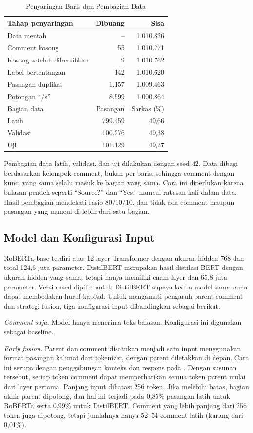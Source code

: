 \documentclass[conference]{IEEEtran}
\begin{document}
\begin{table}[t]
\caption{Penyaringan Baris dan Pembagian Data}
\label{tab:data}
\centering
\begin{tabular}{lrr}
\hline
Tahap penyaringan & Dibuang & Sisa \\
\hline
Data mentah & -- & 1.010.826 \\
Comment kosong & 55 & 1.010.771 \\
Kosong setelah dibersihkan & 9 & 1.010.762 \\
Label bertentangan & 142 & 1.010.620 \\
Pasangan duplikat & 1.157 & 1.009.463 \\
Potongan ``/s'' & 8.599 & 1.000.864 \\
\hline
Bagian data & Pasangan & Sarkas (\%) \\
\hline
Latih & 799.459 & 49,66 \\
Validasi & 100.276 & 49,38 \\
Uji & 101.129 & 49,27 \\
\hline
\end{tabular}
\end{table}

Pembagian data latih, validasi, dan uji dilakukan dengan seed 42. Data dibagi berdasarkan kelompok comment, bukan per baris, sehingga comment dengan kunci yang sama selalu masuk ke bagian yang sama. Cara ini diperlukan karena balasan pendek seperti ``Source?'' dan ``Yes.'' muncul ratusan kali dalam data. Hasil pembagian mendekati rasio 80/10/10, dan tidak ada comment maupun pasangan yang muncul di lebih dari satu bagian.

\subsection{Model dan Konfigurasi Input}
RoBERTa-base \cite{liu2019roberta} terdiri atas 12 layer Transformer dengan ukuran hidden 768 dan total 124,6 juta parameter. DistilBERT \cite{sanh2019distilbert} merupakan hasil distilasi BERT dengan ukuran hidden yang sama, tetapi hanya memiliki enam layer dan 65,8 juta parameter. Versi cased dipilih untuk DistilBERT supaya kedua model sama-sama dapat membedakan huruf kapital. Untuk mengamati pengaruh parent comment dan strategi fusion, tiga konfigurasi input dibandingkan sebagai berikut.

\textit{Comment saja.} Model hanya menerima teks balasan. Konfigurasi ini digunakan sebagai baseline.

\textit{Early fusion.} Parent dan comment disatukan menjadi satu input menggunakan format pasangan kalimat dari tokenizer, dengan parent diletakkan di depan. Cara ini serupa dengan penggabungan konteks dan respons pada \cite{ataeii2020transformers}. Dengan susunan tersebut, setiap token comment dapat memperhatikan semua token parent mulai dari layer pertama. Panjang input dibatasi 256 token. Jika melebihi batas, bagian akhir parent dipotong, dan hal ini terjadi pada 0,85\% pasangan latih untuk RoBERTa serta 0,99\% untuk DistilBERT. Comment yang lebih panjang dari 256 token juga dipotong, tetapi jumlahnya hanya 52--54 comment latih (kurang dari 0,01\%).
\end{document}
